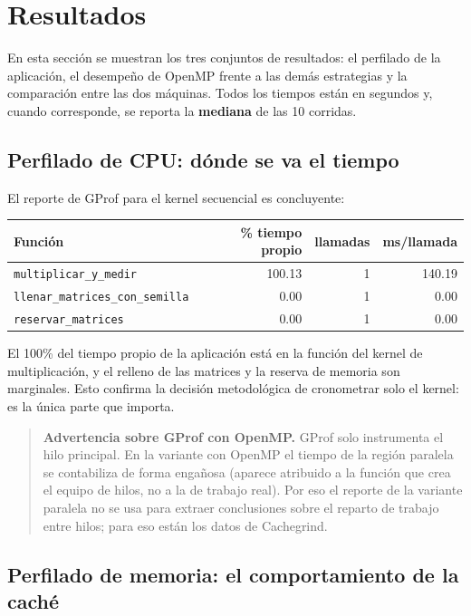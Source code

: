 \section{Resultados}

En esta sección se muestran los tres conjuntos de resultados: el perfilado de la aplicación, el desempeño de OpenMP frente a las demás estrategias y la comparación entre las dos máquinas. Todos los tiempos están en segundos y, cuando corresponde, se reporta la \textbf{mediana} de las 10 corridas.

\subsection{Perfilado de CPU: dónde se va el tiempo}

El reporte de GProf para el kernel secuencial es concluyente:

\begin{center}
\begin{tabular}{|l|r|r|r|}
\hline
\textbf{Función} & \textbf{\% tiempo propio} & \textbf{llamadas} & \textbf{ms/llamada} \\
\hline
\texttt{multiplicar\_y\_medir} & 100.13 & 1 & 140.19 \\
\texttt{llenar\_matrices\_con\_semilla} & 0.00 & 1 & 0.00 \\
\texttt{reservar\_matrices} & 0.00 & 1 & 0.00 \\
\hline
\end{tabular}
\end{center}

El 100\% del tiempo propio de la aplicación está en la función del kernel de multiplicación, y el relleno de las matrices y la reserva de memoria son marginales. Esto confirma la decisión metodológica de cronometrar solo el kernel: es la única parte que importa.

\begin{quote}
\textbf{Advertencia sobre GProf con OpenMP.} GProf solo instrumenta el hilo principal. En la variante con OpenMP el tiempo de la región paralela se contabiliza de forma engañosa (aparece atribuido a la función que crea el equipo de hilos, no a la de trabajo real). Por eso el reporte de la variante paralela no se usa para extraer conclusiones sobre el reparto de trabajo entre hilos; para eso están los datos de Cachegrind.
\end{quote}

\subsection{Perfilado de memoria: el comportamiento de la caché}

